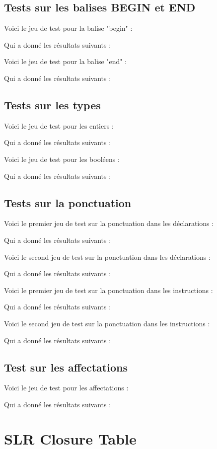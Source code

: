 \documentclass{rapport}
\begin{document}
    \section{Tests sur les balises BEGIN et END}
    \begin{multicols}{2}
        Voici le jeu de test pour la balise  "begin" :
        

        Qui a donné les résultats suivants :
        

        \setlength{\columnseprule}{0.5pt}

        Voici le jeu de test pour la balise "end" :
        

        Qui a donné les résultats suivants :
        
    \end{multicols}

    \newpage
    \section{Tests sur les types}
    \begin{multicols}{2}
        Voici le jeu de test pour les entiers :
        
        Qui a donné les résultats suivants :
        
        \setlength{\columnseprule}{0.5pt}
        Voici le jeu de test pour les booléens :
        
        Qui a donné les résultats suivants :
        
    \end{multicols}

    \section{Tests sur la ponctuation}
    \begin{multicols}{2}
        Voici le premier jeu de test sur la ponctuation dans les déclarations :
        
        Qui a donné les résultats suivants :
        
        Voici le second jeu de test sur la ponctuation dans les déclarations :
        
        Qui a donné les résultats suivants :
        
        \setlength{\columnseprule}{0.5pt}
        Voici le premier jeu de test sur la ponctuation dans les instructions :
        
        Qui a donné les résultats suivants :
        
        Voici le second jeu de test sur la ponctuation dans les instructions :
        
        Qui a donné les résultats suivants :
        
    \end{multicols}

    \section{Test sur les affectations}
    Voici le jeu de test pour les affectations :
    
    Qui a donné les résultats suivants :
    

    \appendix
    \chapter{SLR Closure Table}
    \label{slr_closure}
    
\end{document}
